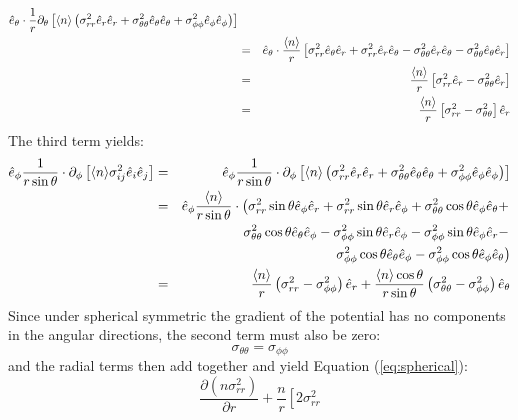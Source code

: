 \begin{enumerate}
\begin{answer}
\begin{eqnarray}
{\hat e}_\theta \cdot \frac{1}{r} \partial_\theta
\left[\langle n \rangle \left(\sigma_{rr}^2 {\hat e}_r {\hat e}_r +
\sigma_{\theta\theta}^2 {\hat e}_\theta {\hat e}_\theta +
\sigma_{\phi\phi}^2 {\hat e}_\phi {\hat e}_\phi\right) \right] 
\cr
&=& {\hat e}_\theta \cdot \frac{\langle n \rangle}{r}
\left[
\sigma_{rr}^2 {\hat e}_\theta {\hat e}_r +
\sigma_{rr}^2 {\hat e}_r {\hat e}_\theta -
\sigma_{\theta\theta}^2 {\hat e}_r {\hat e}_\theta -
\sigma_{\theta\theta}^2 {\hat e}_\theta {\hat e}_r\right]\cr
&=& \frac{\langle n \rangle}{r}
\left[
\sigma_{rr}^2 {\hat e}_r -
\sigma_{\theta\theta}^2 {\hat e}_r\right]\cr
&=& \frac{\langle n \rangle}{r}
\left[
\sigma_{rr}^2 -
\sigma_{\theta\theta}^2 \right] {\hat e}_r
\end{eqnarray}
The third term yields:
\begin{eqnarray}
{\hat e}_\phi \frac{1}{r\sin\theta} \cdot \partial_\phi 
\left[ \langle n\rangle \sigma_{ij}^2 {\hat e}_i {\hat e}_j \right]
&=& 
{\hat e}_\phi \frac{1}{r\sin\theta} \cdot \partial_\phi 
\left[\langle n \rangle \left(\sigma_{rr}^2 {\hat e}_r {\hat e}_r +
\sigma_{\theta\theta}^2 {\hat e}_\theta {\hat e}_\theta +
\sigma_{\phi\phi}^2 {\hat e}_\phi {\hat e}_\phi\right) \right] 
\cr 
&=&
{\hat e}_\phi \frac{\langle n \rangle}{r\sin\theta} \cdot
\left(\sigma_{rr}^2 \sin\theta {\hat e}_\phi {\hat e}_r +
\sigma_{rr}^2 \sin\theta {\hat e}_r {\hat e}_\phi +
\sigma_{\theta\theta}^2 \cos\theta {\hat e}_\phi {\hat e}_\theta +
\right. \cr
&& 
\left.
\sigma_{\theta\theta}^2 \cos\theta {\hat e}_\theta {\hat e}_\phi - 
\sigma_{\phi\phi}^2 \sin\theta {\hat e}_r {\hat e}_\phi -
\sigma_{\phi\phi}^2 \sin\theta {\hat e}_\phi {\hat e}_r - \right. \cr
& &
\left.
\sigma_{\phi\phi}^2 \cos\theta {\hat e}_\theta {\hat e}_\phi -
\sigma_{\phi\phi}^2 \cos\theta {\hat e}_\phi {\hat e}_\theta
\right) \cr
&=&
 \frac{\langle n \rangle}{r} \left(
 \sigma_{rr}^2 - \sigma_{\phi\phi}^2 \right) {\hat e}_r +
 \frac{\langle
 n \rangle \cos\theta}{r \sin\theta} \left(\sigma_{\theta\theta}^2
 - \sigma_{\phi\phi}^2\right) {\hat e}_\theta
\end{eqnarray}
Since under spherical symmetric the gradient of the potential has no
components in the angular directions, the second term must also be
zero:
\begin{equation}
\sigma_{\theta\theta} = \sigma_{\phi\phi}
\end{equation}
and the radial terms then add together and yield Equation
(\ref{eq:spherical}):
\begin{equation}
\frac{\partial(n \sigma_{rr}^2)}{\partial r}
+ \frac{n}{r} \left[2 \sigma_{rr}^2

\end{equation}
\end{answer}
\end{enumerate}
